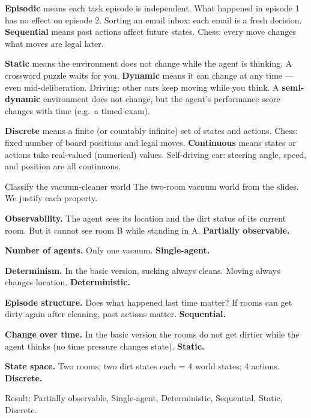 \documentclass[a4paper,11pt]{article}
\begin{document}
\textbf{Episodic} means each task episode is independent.
What happened in episode 1 has no effect on episode 2.
Sorting an email inbox: each email is a fresh decision.
\textbf{Sequential} means past actions affect future states.
Chess: every move changes what moves are legal later.

\textbf{Static} means the environment does not change while the agent is
thinking.
A crossword puzzle waits for you.
\textbf{Dynamic} means it can change at any time --- even mid-deliberation.
Driving: other cars keep moving while you think.
A \textbf{semi-dynamic} environment does not change, but the agent's
performance score changes with time (e.g.\ a timed exam).

\textbf{Discrete} means a finite (or countably infinite) set of states and
actions.
Chess: fixed number of board positions and legal moves.
\textbf{Continuous} means states or actions take real-valued (numerical)
values.
Self-driving car: steering angle, speed, and position are all continuous.

\begin{worked}{Classify the vacuum-cleaner world}
The two-room vacuum world from the slides. We justify each property.
\begin{steps}
  \item \textbf{Observability.} The agent sees its location and the
        dirt status of its current room. But it cannot see room B while
        standing in A. \textbf{Partially observable.}
  \item \textbf{Number of agents.} Only one vacuum.
        \textbf{Single-agent.}
  \item \textbf{Determinism.} In the basic version, sucking always cleans.
        Moving always changes location.
        \textbf{Deterministic.}
  \item \textbf{Episode structure.} Does what happened last time matter?
        If rooms can get dirty again after cleaning, past actions matter.
        \textbf{Sequential.}
  \item \textbf{Change over time.} In the basic version the rooms do not
        get dirtier while the agent thinks (no time pressure changes state).
        \textbf{Static.}
  \item \textbf{State space.} Two rooms, two dirt states each = 4 world
        states; 4 actions.
        \textbf{Discrete.}
\end{steps}
Result: Partially observable, Single-agent, Deterministic,
Sequential, Static, Discrete.
\end{worked}
\end{document}
